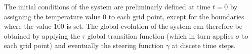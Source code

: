     The initial conditions of the system are preliminarly defined at
    time $t=0$ by assigning the temperature value 0 to each grid
    point, except for the boundaries where the value 100 is set. The
    global evolution of the system can therefore be obtained by
    applying the $\tau$ global transition function (which in turn
    applies $\sigma$ to each grid point) and eventually the steering
    function $\gamma$ at discete time steps.
    
    
    